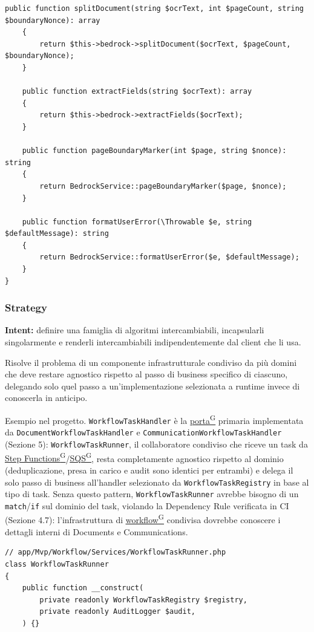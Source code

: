\documentclass[a4paper,12pt]{article}
\providecommand{\glslink}[2]{\href{https://alittlebyte-19.github.io/Documentazione/glossario.html\#gls-#1}{\underline{#2}\textsuperscript{\scriptsize G}}}
\begin{document}
\begin{sloppypar}
\begin{lstlisting}[style=phplisting, caption={BedrockDocumentAiAdapter -- adapter secondario sopra BedrockService}]
    public function splitDocument(string $ocrText, int $pageCount, string $boundaryNonce): array
    {
        return $this->bedrock->splitDocument($ocrText, $pageCount, $boundaryNonce);
    }

    public function extractFields(string $ocrText): array
    {
        return $this->bedrock->extractFields($ocrText);
    }

    public function pageBoundaryMarker(int $page, string $nonce): string
    {
        return BedrockService::pageBoundaryMarker($page, $nonce);
    }

    public function formatUserError(\Throwable $e, string $defaultMessage): string
    {
        return BedrockService::formatUserError($e, $defaultMessage);
    }
}
\end{lstlisting}

\subsubsection{Strategy}

\textbf{Intent:} definire una famiglia di algoritmi intercambiabili, incapsularli singolarmente e renderli intercambiabili indipendentemente dal client che li usa.

Risolve il problema di un componente infrastrutturale condiviso da più domini che deve restare agnostico rispetto al passo di business specifico di ciascuno, delegando solo quel passo a un'implementazione selezionata a runtime invece di conoscerla in anticipo.

Esempio nel progetto. \texttt{WorkflowTaskHandler} è la \glslink{porta}{porta} primaria implementata da \texttt{DocumentWorkflowTaskHandler} e \texttt{CommunicationWorkflowTaskHandler} (Sezione 5): \texttt{WorkflowTaskRunner}, il collaboratore condiviso che riceve un task da \glslink{step-functions}{Step Functions}/\glslink{sqs-simple-queue-service}{SQS}, resta completamente agnostico rispetto al dominio (deduplicazione, presa in carico e audit sono identici per entrambi) e delega il solo passo di business all'handler selezionato da \texttt{WorkflowTaskRegistry} in base al tipo di task. Senza questo pattern, \texttt{WorkflowTaskRunner} avrebbe bisogno di un \texttt{match}/\texttt{if} sul dominio del task, violando la Dependency Rule verificata in CI (Sezione 4.7): l'infrastruttura di \glslink{workflow}{workflow} condivisa dovrebbe conoscere i dettagli interni di Documents e Communications.

\begin{lstlisting}[style=phplisting, caption={WorkflowTaskRunner -- selezione della Strategy concreta e delega del passo di business}]
// app/Mvp/Workflow/Services/WorkflowTaskRunner.php
class WorkflowTaskRunner
{
    public function __construct(
        private readonly WorkflowTaskRegistry $registry,
        private readonly AuditLogger $audit,
    ) {}


\end{lstlisting}
\end{sloppypar}
\end{document}
